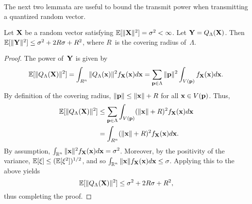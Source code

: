 %
%
The next two lemmata are useful to bound the transmit power when transmitting a
quantized random vector.
\begin{lemma}
  \label{lem:latquantvar}
  Let $\mathbf{X}$ be a random vector satisfying $\mathbb{E}[\|\mathbf{X}\|^2] = {\sigma^2} < \infty$. Let $\mathbf{Y}
  = {Q_{\Lambda}}(\mathbf{X})$. Then $\mathbb{E}[\|\mathbf{Y}\|^2] \le {\sigma^2} + 2R\sigma + R^2$, where $R$~is the
  covering radius of~$\Lambda$.
\end{lemma}

\begin{proof}
  The power of~$\mathbf{Y}$ is given by
  \begin{equation*}
    \mathbb{E}[\|{Q_{\Lambda}}(\mathbf{X})\|^2] = \int_{R^n} \|{Q_{\Lambda}}(\mathbf{x})\|^2 f_{\mathbf{X}}(\mathbf{x}) d\mathbf{x}
    = \sum_{\mathbf{p} \in \Lambda} \|\mathbf{p}\|^2 \int_{V(\mathbf{p})} f_{\mathbf{X}}(\mathbf{x}) d\mathbf{x}.
  \end{equation*}
  By definition of the covering radius, $\|\mathbf{p}\| \le \|\mathbf{x}\| + R$ for all $\mathbf{x} \in
  V(\mathbf{p})$. Thus,
  \begin{align*}
    \mathbb{E}[\|{Q_{\Lambda}}(\mathbf{X})\|^2] &\le \sum_{\mathbf{p} \in \Lambda} \int_{V(\mathbf{p})} (\|\mathbf{x}\| + R)^2
    f_{\mathbf{X}}(\mathbf{x}) d\mathbf{x} \\
    &= \int_{R^n} (\|\mathbf{x}\| + R)^2 f_{\mathbf{X}}(\mathbf{x}) d\mathbf{x}.
  \end{align*}
  By assumption, $\int_{\mathbb{R}^n} \|\mathbf{x}\|^2 f_{\mathbf{X}}(\mathbf{x}) d\mathbf{x} = {\sigma^2}$. Moreover, by the
  positivity of the variance, $\mathbb{E}[\xi] \le (\mathbb{E}[\xi^2])^{1/2}$, and so
  $\int_{\mathbb{R}^n} \|\mathbf{x}\| f_{\mathbf{X}}(\mathbf{x}) d\mathbf{x} \le \sigma$. Applying this to the above
  yields
  \begin{equation*}
    \mathbb{E}[\|{Q_{\Lambda}}(\mathbf{X})\|^2] \le {\sigma^2} + 2R\sigma + R^2,
  \end{equation*}
  thus completing the proof.
\end{proof}

